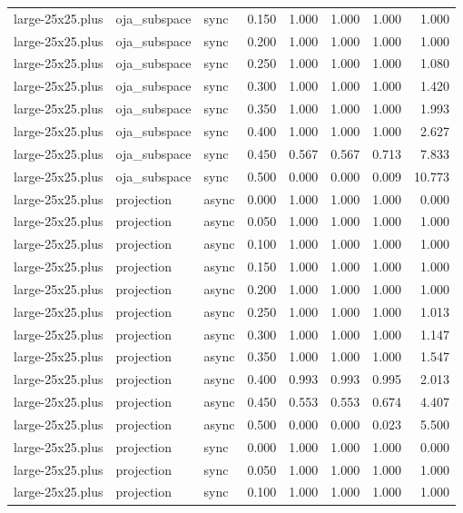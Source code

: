 \begin{tabular}{lllrrrrr}
large-25x25.plus & oja\_subspace & sync & 0.150 & 1.000 & 1.000 & 1.000 & 1.000 \\
large-25x25.plus & oja\_subspace & sync & 0.200 & 1.000 & 1.000 & 1.000 & 1.000 \\
large-25x25.plus & oja\_subspace & sync & 0.250 & 1.000 & 1.000 & 1.000 & 1.080 \\
large-25x25.plus & oja\_subspace & sync & 0.300 & 1.000 & 1.000 & 1.000 & 1.420 \\
large-25x25.plus & oja\_subspace & sync & 0.350 & 1.000 & 1.000 & 1.000 & 1.993 \\
large-25x25.plus & oja\_subspace & sync & 0.400 & 1.000 & 1.000 & 1.000 & 2.627 \\
large-25x25.plus & oja\_subspace & sync & 0.450 & 0.567 & 0.567 & 0.713 & 7.833 \\
large-25x25.plus & oja\_subspace & sync & 0.500 & 0.000 & 0.000 & 0.009 & 10.773 \\
large-25x25.plus & projection & async & 0.000 & 1.000 & 1.000 & 1.000 & 0.000 \\
large-25x25.plus & projection & async & 0.050 & 1.000 & 1.000 & 1.000 & 1.000 \\
large-25x25.plus & projection & async & 0.100 & 1.000 & 1.000 & 1.000 & 1.000 \\
large-25x25.plus & projection & async & 0.150 & 1.000 & 1.000 & 1.000 & 1.000 \\
large-25x25.plus & projection & async & 0.200 & 1.000 & 1.000 & 1.000 & 1.000 \\
large-25x25.plus & projection & async & 0.250 & 1.000 & 1.000 & 1.000 & 1.013 \\
large-25x25.plus & projection & async & 0.300 & 1.000 & 1.000 & 1.000 & 1.147 \\
large-25x25.plus & projection & async & 0.350 & 1.000 & 1.000 & 1.000 & 1.547 \\
large-25x25.plus & projection & async & 0.400 & 0.993 & 0.993 & 0.995 & 2.013 \\
large-25x25.plus & projection & async & 0.450 & 0.553 & 0.553 & 0.674 & 4.407 \\
large-25x25.plus & projection & async & 0.500 & 0.000 & 0.000 & 0.023 & 5.500 \\
large-25x25.plus & projection & sync & 0.000 & 1.000 & 1.000 & 1.000 & 0.000 \\
large-25x25.plus & projection & sync & 0.050 & 1.000 & 1.000 & 1.000 & 1.000 \\
large-25x25.plus & projection & sync & 0.100 & 1.000 & 1.000 & 1.000 & 1.000 \\

\end{tabular}
